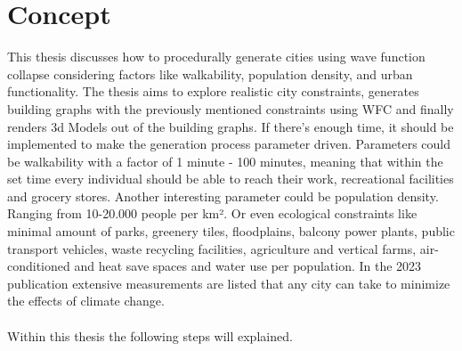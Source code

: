 \section{Concept} 
This thesis discusses how to procedurally generate cities using wave function collapse considering factors like walkability, population density, and urban functionality. The thesis aims to explore realistic city constraints, generates building graphs with the previously mentioned constraints using WFC and finally renders 3d Models out of the building graphs. If there's enough time, it should be implemented to make the generation process parameter driven. Parameters could be walkability with a factor of 1 minute - 100 minutes, meaning that within the set time every individual should be able to reach their work, recreational facilities and grocery stores. Another interesting parameter could be population density. Ranging from  10-20.000 people per km². Or even ecological constraints like minimal amount of parks, greenery tiles, floodplains, balcony power plants, public transport vehicles, waste recycling facilities, agriculture and vertical farms, air-conditioned and heat save spaces and water use per population. In the 2023 publication  extensive measurements are listed that any city can take to minimize the effects of climate change.
\\
\\
Within this thesis the following steps will explained. 

